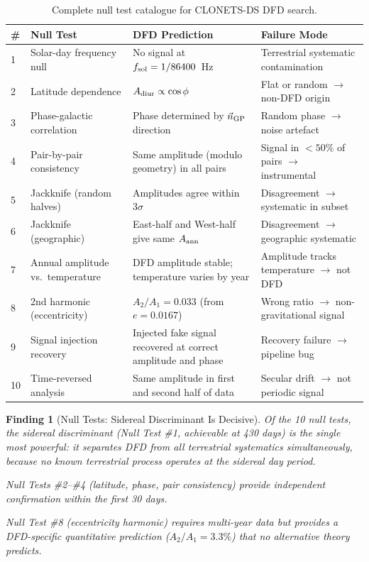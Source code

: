 \documentclass[11pt]{article}
\newtheorem{finding}{Finding}
\begin{document}
\begin{table}[H]
\centering
\caption{Complete null test catalogue for CLONETS-DS DFD search.}
\label{tab:null-tests}
\begin{tabular}{p{0.4cm}p{3.5cm}p{4cm}p{4cm}}
\toprule
\# & \textbf{Null Test} & \textbf{DFD Prediction} & \textbf{Failure Mode} \\
\midrule
1 & Solar-day frequency null &
  No signal at $f_{\rm sol} = 1/86400$~Hz &
  Terrestrial systematic contamination \\[4pt]
2 & Latitude dependence &
  $A_{\rm diur} \propto \cos\phi$ &
  Flat or random $\to$ non-DFD origin \\[4pt]
3 & Phase-galactic correlation &
  Phase determined by $\vec{n}_{\rm GP}$ direction &
  Random phase $\to$ noise artefact \\[4pt]
4 & Pair-by-pair consistency &
  Same amplitude (modulo geometry) in all pairs &
  Signal in $< 50\%$ of pairs $\to$ instrumental \\[4pt]
5 & Jackknife (random halves) &
  Amplitudes agree within $3\sigma$ &
  Disagreement $\to$ systematic in subset \\[4pt]
6 & Jackknife (geographic) &
  East-half and West-half give same $A_{\rm ann}$ &
  Disagreement $\to$ geographic systematic \\[4pt]
7 & Annual amplitude vs.\ temperature &
  DFD amplitude stable; temperature varies by year &
  Amplitude tracks temperature $\to$ not DFD \\[4pt]
8 & 2nd harmonic (eccentricity) &
  $A_2/A_1 = 0.033$ (from $e = 0.0167$) &
  Wrong ratio $\to$ non-gravitational signal \\[4pt]
9 & Signal injection recovery &
  Injected fake signal recovered at correct
  amplitude and phase &
  Recovery failure $\to$ pipeline bug \\[4pt]
10 & Time-reversed analysis &
  Same amplitude in first and second half of data &
  Secular drift $\to$ not periodic signal \\
\bottomrule
\end{tabular}
\end{table}

\begin{finding}[Null Tests: Sidereal Discriminant Is Decisive]
\label{find:null-decisive}
Of the 10 null tests, the sidereal discriminant (Null Test \#1,
achievable at 430 days) is the single most powerful: it separates
DFD from \emph{all} terrestrial systematics simultaneously, because
no known terrestrial process operates at the sidereal day period.

Null Tests \#2--\#4 (latitude, phase, pair consistency) provide
independent confirmation within the first 30 days.

Null Test \#8 (eccentricity harmonic) requires multi-year data but
provides a DFD-specific quantitative prediction ($A_2/A_1 = 3.3\%$)
that no alternative theory predicts.
\end{finding}
\end{document}
